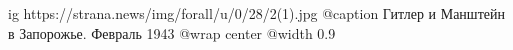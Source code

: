  
 
 
 
 

\ifcmt
  ig https://strana.news/img/forall/u/0/28/2(1).jpg
	@caption Гитлер и Манштейн в Запорожье. Февраль 1943
  @wrap center
  @width 0.9
\fi
